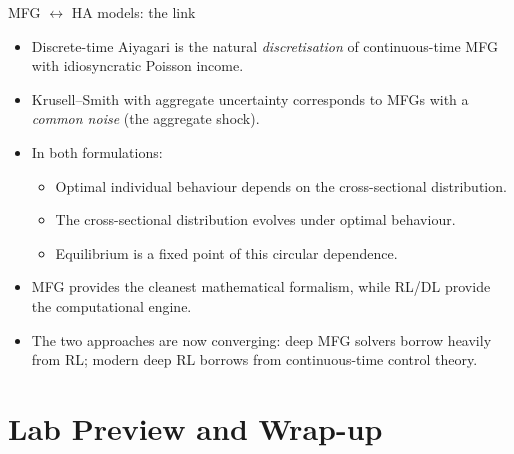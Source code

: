 \documentclass[10pt,english,aspectratio=169]{beamer}
\begin{document}
\begin{frame}{MFG $\leftrightarrow$ HA models: the link}
\begin{itemize}
\item Discrete-time Aiyagari is the natural \emph{discretisation} of continuous-time MFG with idiosyncratic Poisson income.
\medskip
\item Krusell--Smith with aggregate uncertainty corresponds to MFGs with a \emph{common noise} (the aggregate shock).
\medskip
\item In both formulations:
  \begin{itemize}
  \item Optimal individual behaviour depends on the cross-sectional distribution.
  \item The cross-sectional distribution evolves under optimal behaviour.
  \item Equilibrium is a fixed point of this circular dependence.
  \end{itemize}
\medskip
\item MFG provides the cleanest mathematical formalism, while RL/DL provide the computational engine.
\medskip
\item The two approaches are now converging: deep MFG solvers borrow heavily from RL; modern deep RL borrows from continuous-time control theory.
\end{itemize}
\end{frame}


\section{Lab Preview and Wrap-up}
\end{document}
